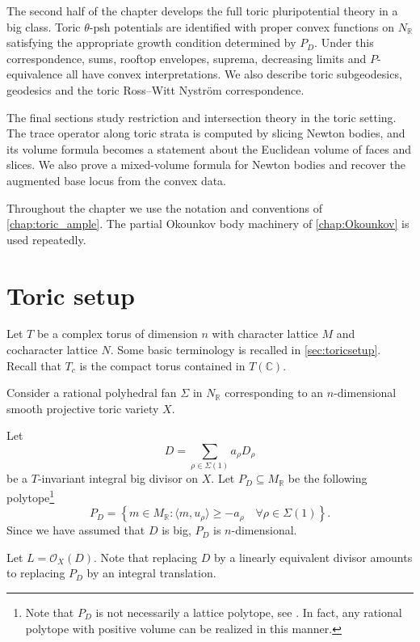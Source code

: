 The second half of the chapter develops the full toric pluripotential theory in a big class. Toric $\theta$-psh potentials are identified with proper convex functions on $N_{\mathbb R}$ satisfying the appropriate growth condition determined by $P_D$. Under this correspondence, sums, rooftop envelopes, suprema, decreasing limits and $P$-equivalence all have convex interpretations. We also describe toric subgeodesics, geodesics and the toric Ross--Witt Nystr\"om correspondence.

The final sections study restriction and intersection theory in the toric setting. The trace operator along toric strata is computed by slicing Newton bodies, and its volume formula becomes a statement about the Euclidean volume of faces and slices. We also prove a mixed-volume formula for Newton bodies and recover the augmented base locus from the convex data.

Throughout the chapter we use the notation and conventions of \cref{chap:toric_ample}. The partial Okounkov body machinery of \cref{chap:Okounkov} is used repeatedly.


\section{Toric setup}\label{sec:toricsetup2}
Let $T$ be a complex torus of dimension $n$ with character lattice $M$ and cocharacter lattice $N$. Some basic terminology is recalled in \cref{sec:toricsetup}.
Recall that $T_c$ is the compact torus contained in $T(\mathbb{C})$.

Consider a rational polyhedral fan $\Sigma$ in $N_{\mathbb{R}}$ corresponding to an $n$-dimensional smooth projective toric variety $X$.

Let
\[
D=\sum_{\rho\in \Sigma(1)} a_{\rho}D_{\rho}
\]
be a $T$-invariant integral big divisor on $X$. Let $P_D\subseteq M_{\mathbb{R}}$ be the following polytope\footnote{Note that $P_D$ is not necessarily a lattice polytope, see \cite[Example~10.5.4]{CLS11}. In fact, any rational polytope with positive volume can be realized in this manner.}
\begin{equation}\label{eq:bigPrep}
P_D=\left\{ m\in M_{\mathbb{R}}: \langle m,u_{\rho}\rangle \geq -a_{\rho}\quad \forall \rho\in \Sigma(1)\right\}.
\end{equation}
Since we have assumed that $D$ is big, $P_D$ is $n$-dimensional.

Let $L=\mathcal{O}_X(D)$.
Note that replacing $D$ by a linearly equivalent divisor amounts to replacing $P_D$ by an integral translation.

